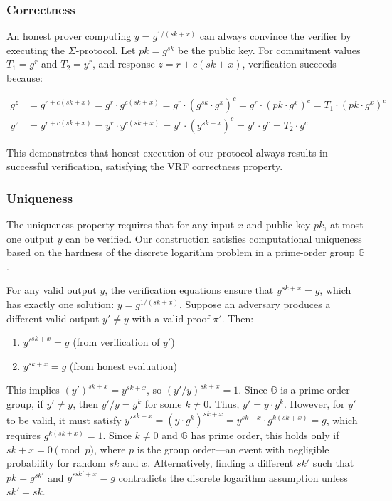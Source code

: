 \subsubsection{Correctness}
An honest prover computing $y = g^{1/(sk+x)}$ can always convince the verifier by executing the $\Sigma$-protocol. Let $pk = g^{sk}$ be the public key. For commitment values $T_1 = g^r$ and $T_2 = y^r$, and response $z = r + c(sk+x)$, verification succeeds because:

\begin{align}
g^z &= g^{r + c(sk+x)} = g^r \cdot g^{c(sk+x)} = g^r \cdot (g^{sk} \cdot g^x)^c = g^r \cdot (pk \cdot g^x)^c = T_1 \cdot (pk \cdot g^x)^c \\
y^z &= y^{r + c(sk+x)} = y^r \cdot y^{c(sk+x)} = y^r \cdot (y^{sk+x})^c = y^r \cdot g^c = T_2 \cdot g^c
\end{align}

This demonstrates that honest execution of our protocol always results in successful verification, satisfying the VRF correctness property.



\subsubsection{Uniqueness}
The uniqueness property requires that for any input $x$ and public key $pk$, at most one output $y$ can be verified. Our construction satisfies computational uniqueness based on the hardness of the discrete logarithm problem in a prime-order group $\mathbb{G}$.

For any valid output $y$, the verification equations ensure that $y^{sk+x} = g$, which has exactly one solution: $y = g^{1/(sk+x)}$. Suppose an adversary produces a different valid output $y' \neq y$ with a valid proof $\pi'$. Then:

\begin{enumerate}
    \item $y'^{sk+x} = g$ (from verification of $y'$)
    \item $y^{sk+x} = g$ (from honest evaluation)
\end{enumerate}

This implies $(y')^{sk+x} = y^{sk+x}$, so $(y'/y)^{sk+x} = 1$. Since $\mathbb{G}$ is a prime-order group, if $y' \neq y$, then $y'/y = g^k$ for some $k \neq 0$. Thus, $y' = y \cdot g^k$. However, for $y'$ to be valid, it must satisfy $y'^{sk+x} = (y \cdot g^k)^{sk+x} = y^{sk+x} \cdot g^{k(sk+x)} = g$, which requires $g^{k(sk+x)} = 1$. Since $k \neq 0$ and $\mathbb{G}$ has prime order, this holds only if $sk + x = 0 \pmod{p}$, where $p$ is the group order—an event with negligible probability for random $sk$ and $x$. Alternatively, finding a different $sk'$ such that $pk = g^{sk'}$ and $y'^{sk'+x} = g$ contradicts the discrete logarithm assumption unless $sk' = sk$.


